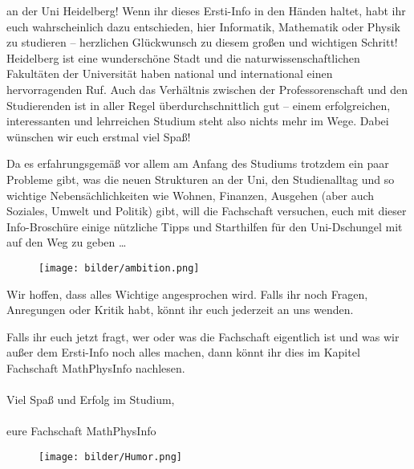 an der Uni Heidelberg! Wenn ihr dieses Ersti-Info in den Händen haltet, habt ihr euch wahrscheinlich dazu entschieden, hier Informatik, Mathematik oder Physik zu studieren -- herzlichen Glückwunsch zu diesem großen und wichtigen Schritt! Heidelberg ist eine wunderschöne Stadt und die naturwissenschaftlichen Fakultäten der Universität haben national und international einen hervorragenden Ruf. Auch das Verhältnis zwischen der Professorenschaft und den Studierenden ist in aller Regel überdurchschnittlich gut -- einem erfolgreichen, interessanten und lehrreichen Studium steht also nichts mehr im Wege. Dabei wünschen wir euch erstmal viel Spaß! \smiley

Da es erfahrungsgemäß vor allem am Anfang des Studiums trotzdem ein paar Probleme gibt, was die neuen Strukturen an der Uni, den Studienalltag und so wichtige Nebensächlichkeiten wie Wohnen, Finanzen, Ausgehen (aber auch Soziales, Umwelt und Politik) gibt, will die Fachschaft versuchen, euch mit dieser Info-Broschüre einige nützliche Tipps und Starthilfen für den Uni-Dschungel mit auf den Weg zu geben \dots

\vfill

\begin{figure}[b]
\centering
\texttt{[image: bilder/ambition.png]}
\end{figure}

\eject

Wir hoffen, dass alles Wichtige angesprochen wird. Falls ihr noch Fragen, Anregungen oder Kritik habt, könnt ihr euch jederzeit an uns wenden.

Falls ihr euch jetzt fragt, wer oder was die Fachschaft eigentlich ist und was wir außer dem Ersti-Info noch alles machen, dann könnt ihr dies im Kapitel Fachschaft MathPhysInfo nachlesen. \\\\
\noindent Viel Spaß und Erfolg im Studium,\\\\

eure Fachschaft MathPhysInfo


\begin{figure}[b]
\centering
\texttt{[image: bilder/Humor.png]}
\end{figure}